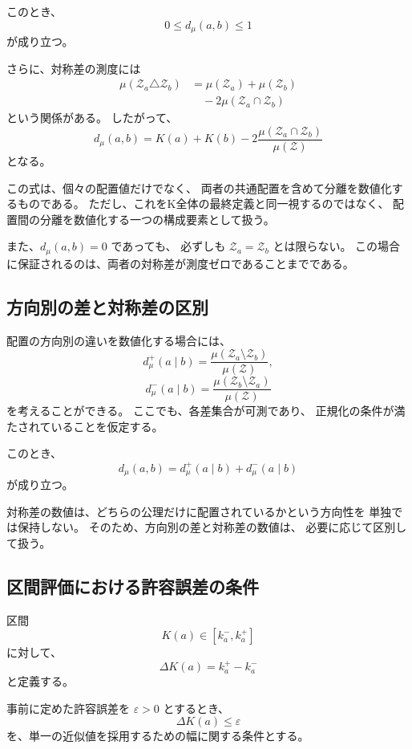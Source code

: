 \documentclass[a4paper,12pt]{article}
\begin{document}
このとき、
\[
    0\leq d_\mu(a,b)\leq1
\]
が成り立つ。

さらに、対称差の測度には
\[
\begin{aligned}
    \mu(\mathcal{Z}_a\triangle\mathcal{Z}_b)
    &=
    \mu(\mathcal{Z}_a)
    +\mu(\mathcal{Z}_b)\\
    &\quad
    -2\mu(\mathcal{Z}_a\cap\mathcal{Z}_b)
\end{aligned}
\]
という関係がある。
したがって、
\[
    d_\mu(a,b)
    =
    K(a)+K(b)
    -2\frac{\mu(\mathcal{Z}_a\cap\mathcal{Z}_b)}
             {\mu(\mathcal{Z})}
\]
となる。

この式は、個々の配置値だけでなく、
両者の共通配置を含めて分離を数値化するものである。
ただし、これをK全体の最終定義と同一視するのではなく、
配置間の分離を数値化する一つの構成要素として扱う。

また、$d_\mu(a,b)=0$ であっても、
必ずしも $\mathcal{Z}_a=\mathcal{Z}_b$ とは限らない。
この場合に保証されるのは、両者の対称差が測度ゼロであることまでである。

\subsection{方向別の差と対称差の区別}

配置の方向別の違いを数値化する場合には、
\[
    d_\mu^+(a\mid b)
    =
    \frac{\mu(\mathcal{Z}_a\setminus\mathcal{Z}_b)}
         {\mu(\mathcal{Z})},
\]
\[
    d_\mu^-(a\mid b)
    =
    \frac{\mu(\mathcal{Z}_b\setminus\mathcal{Z}_a)}
         {\mu(\mathcal{Z})}
\]
を考えることができる。
ここでも、各差集合が可測であり、
正規化の条件が満たされていることを仮定する。

このとき、
\[
    d_\mu(a,b)
    =
    d_\mu^+(a\mid b)+d_\mu^-(a\mid b)
\]
が成り立つ。

対称差の数値は、どちらの公理だけに配置されているかという方向性を
単独では保持しない。
そのため、方向別の差と対称差の数値は、
必要に応じて区別して扱う。

\subsection{区間評価における許容誤差の条件}

区間
\[
    K(a)\in[k_a^-,k_a^+]
\]
に対して、
\[
    \Delta K(a)=k_a^+-k_a^-
\]
と定義する。

事前に定めた許容誤差を $\varepsilon>0$ とするとき、
\[
    \Delta K(a)\leq\varepsilon
\]
を、単一の近似値を採用するための幅に関する条件とする。
\end{document}
